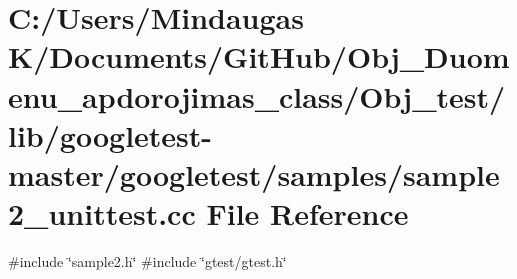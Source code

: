 \hypertarget{_obj__test_2lib_2googletest-master_2googletest_2samples_2sample2__unittest_8cc}{}\section{C\+:/\+Users/\+Mindaugas K/\+Documents/\+Git\+Hub/\+Obj\+\_\+\+Duomenu\+\_\+apdorojimas\+\_\+class/\+Obj\+\_\+test/lib/googletest-\/master/googletest/samples/sample2\+\_\+unittest.cc File Reference}
\label{_obj__test_2lib_2googletest-master_2googletest_2samples_2sample2__unittest_8cc}
{\ttfamily \#include \char`\"{}sample2.\+h\char`\"{}}\newline
{\ttfamily \#include \char`\"{}gtest/gtest.\+h\char`\"{}}\newline
